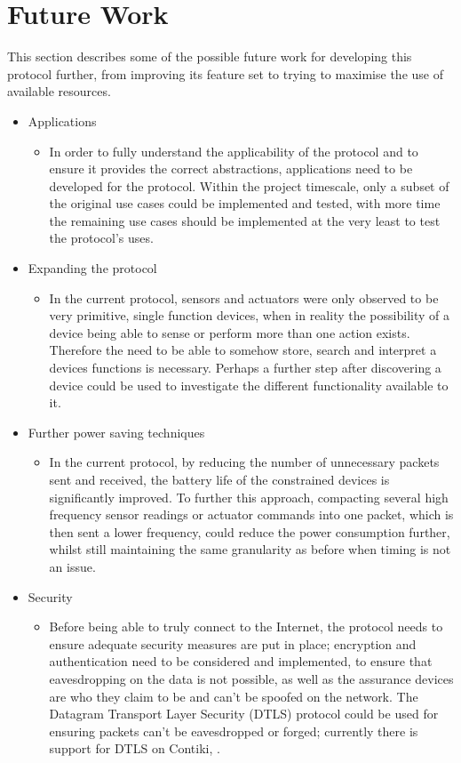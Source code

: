 \section{Future Work}
This section describes some of the possible future work for developing this protocol further, from improving its feature set to trying to maximise the use of available resources.
\begin{itemize}
	\item Applications
	\begin{itemize}
		\item In order to fully understand the applicability of the protocol and to ensure it provides the correct abstractions, applications need to be developed for the protocol. Within the project timescale, only a subset of the original use cases could be implemented and tested, with more time the remaining use cases should be implemented at the very least to test the protocol's uses.
	\end{itemize}
	\item Expanding the protocol
	\begin{itemize}
		\item In the current protocol, sensors and actuators were only observed to be very primitive, single function devices, when in reality the possibility of a device being able to sense or perform more than one action exists. Therefore the need to be able to somehow store, search and interpret a devices functions is necessary. Perhaps a further step after discovering a device could be used to investigate the different functionality available to it.
	\end{itemize}
	\item Further power saving techniques
	\begin{itemize}
		\item In the current protocol, by reducing the number of unnecessary packets sent and received, the battery life of the constrained devices is significantly improved. To further this approach, compacting several high frequency sensor readings or actuator commands into one packet, which is then sent a lower frequency, could reduce the power consumption further, whilst still maintaining the same granularity as before when timing is not an issue.
	\end{itemize}
	\item Security
	\begin{itemize}
		\item Before being able to truly connect to the Internet, the protocol needs to ensure adequate security measures are put in place; encryption and authentication need to be considered and implemented, to ensure that eavesdropping on the data is not possible, as well as the assurance devices are who they claim to be and can't be spoofed on the network. The Datagram Transport Layer Security (DTLS) protocol could be used for ensuring packets can't be eavesdropped or forged; currently there is support for DTLS on Contiki, \cite{DTLSContiki} .

\end{itemize}
\end{itemize}
